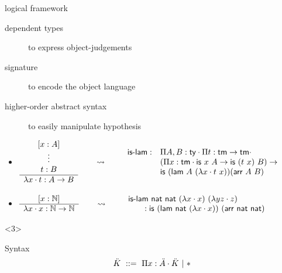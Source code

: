 \documentclass[ignorenonframetext,red]{beamer}
\begin{document}
\begin{frame}{ logical framework }
\begin{onlyenv}
    \begin{description}
    \item[dependent types] to express object-judgements
    \item[signature] to encode the object language
    \item[higher-order abstract syntax] to easily manipulate hypothesis
    \end{description}
    \pause
    \begin{examples}
      \begin{itemize}
      \item \scriptsize
        $
        \begin{array}{c}
          [x:A]\\
          \vdots\\
          t : B \\\hline
          \ulam x t : A\to B
        \end{array}
        \qquad\leadsto\qquad
        \begin{array}{ll}
          \text{\textsf{is-lam}} :& \prd {A,B}{\mathsf{ty}} \prd t {\mathsf{tm}\to \mathsf{tm}} \\
          & (\prd x {\mathsf{tm}} {\textsf{is}\ x\ A} \to \textsf{is}\ (t\ x)\ B) \to \\
          & \textsf{is}\ (\textsf{lam}\ A\ (\ulam x t\ x))(\textsf{arr}\ A\ B)
        \end{array}
        $
      \item
        $
        \begin{array}{c}
          [x:\mathbb N]\\\hline
          \lambda{x}\cdot x : \mathbb N\to\mathbb N
        \end{array}
        \qquad\leadsto\qquad
        \begin{array}{l}
          \text{\textsf{is-lam}}\ \mathsf{nat}\ \mathsf{nat}\ (\lambda{x}\cdot
          x)\ (\lambda{y z}\cdot z) \\ \qquad : \mathsf{is}\ (\mathsf{lam}\
          \mathsf{nat}\ (\lambda{x}\cdot x))\ (\mathsf{arr}\ \mathsf{nat}\
          \mathsf{nat})
        \end{array}
        $
      \end{itemize}
    \end{examples}
  \end{onlyenv}
  \begin{onlyenv}<3>
    \inXLF
    \begin{block}{Syntax}
      \begin{align*}
        \mk &\gequal { \prd\mv\mf\mk \gor \type } \\

\end{align*}
\end{block}
\end{onlyenv}
\end{frame}
\end{document}
